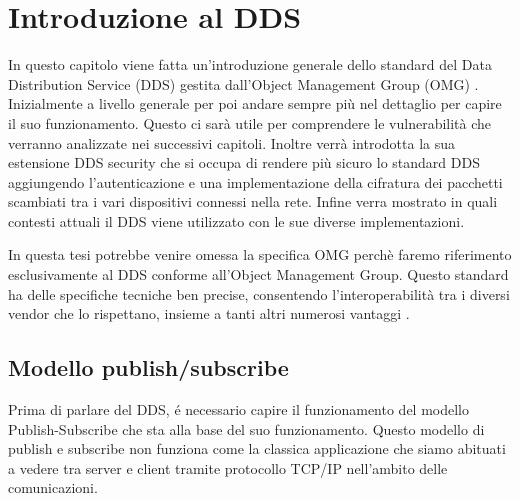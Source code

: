 \chapter{Introduzione al DDS}
In questo capitolo viene fatta un'introduzione generale dello 
standard del Data Distribution Service (DDS) gestita
dall'Object Management Group (OMG) \cite{8469351}. 
Inizialmente a livello generale 
per poi andare sempre più nel
dettaglio per capire il suo funzionamento. Questo ci sarà utile 
per comprendere le vulnerabilità che verranno analizzate nei
successivi capitoli. Inoltre verrà introdotta la sua estensione 
DDS security che si occupa di rendere più sicuro lo standard DDS 
aggiungendo l'autenticazione e una 
implementazione della cifratura dei pacchetti scambiati tra i vari
dispositivi connessi nella rete. 
Infine verra mostrato in quali contesti attuali il DDS viene
utilizzato con le sue diverse implementazioni.

In questa tesi potrebbe venire omessa la specifica OMG perchè 
faremo riferimento
esclusivamente al DDS conforme all'Object Management Group. Questo 
standard ha delle specifiche tecniche ben precise, consentendo
l'interoperabilità tra i diversi vendor che lo rispettano, insieme
a tanti altri numerosi vantaggi \cite{dds1.4}.


\section{Modello publish/subscribe}
Prima di parlare del DDS, é necessario capire il 
funzionamento del modello Publish-Subscribe 
che sta alla base del suo funzionamento.
Questo modello di publish e subscribe non funziona come la 
classica applicazione che siamo abituati a vedere tra server e
client tramite protocollo TCP/IP nell'ambito delle comunicazioni. 


